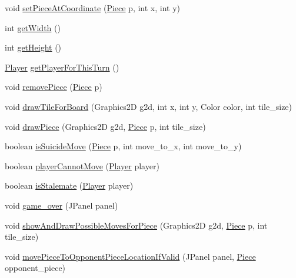 \begin{DoxyCompactItemize}
void \hyperlink{classchess_1_1_chess_board_ae9d535deacab87c0de3ee10c8b8868f4}{set\+Piece\+At\+Coordinate} (\hyperlink{classpiece_1_1_piece}{Piece} p, int x, int y)
\item 
int \hyperlink{classchess_1_1_chess_board_a29781b412843a9db6c65adbaed0a5c07}{get\+Width} ()
\item 
int \hyperlink{classchess_1_1_chess_board_aae882150e2ecfda4defceabadff016c3}{get\+Height} ()
\item 
\hyperlink{enumchess_1_1_player}{Player} \hyperlink{classchess_1_1_chess_board_ae6fe2b06940fa56971e174e01fa22df1}{get\+Player\+For\+This\+Turn} ()
\item 
void \hyperlink{classchess_1_1_chess_board_af2f8678df1f61c42e6abb2591716451a}{remove\+Piece} (\hyperlink{classpiece_1_1_piece}{Piece} p)
\item 
void \hyperlink{classchess_1_1_chess_board_a1511b7e9055bbc9daff70f294bff92bc}{draw\+Tile\+For\+Board} (Graphics2\+D g2d, int x, int y, Color color, int tile\+\_\+size)
\item 
void \hyperlink{classchess_1_1_chess_board_a879f102e91c76d41ef78ccabf1174046}{draw\+Piece} (Graphics2\+D g2d, \hyperlink{classpiece_1_1_piece}{Piece} p, int tile\+\_\+size)
\item 
boolean \hyperlink{classchess_1_1_chess_board_a9afd8643586328685ca7bcbcf1cec4a4}{is\+Suicide\+Move} (\hyperlink{classpiece_1_1_piece}{Piece} p, int move\+\_\+to\+\_\+x, int move\+\_\+to\+\_\+y)
\item 
boolean \hyperlink{classchess_1_1_chess_board_a1eef0b88f595b1501b2d12ab5e373e6f}{player\+Cannot\+Move} (\hyperlink{enumchess_1_1_player}{Player} player)
\item 
boolean \hyperlink{classchess_1_1_chess_board_ae8b13d31ee134f4365bc051b6178b2b5}{is\+Stalemate} (\hyperlink{enumchess_1_1_player}{Player} player)
\item 
void \hyperlink{classchess_1_1_chess_board_a81c34b69d1ab11b82272beb72bdb3555}{game\+\_\+over} (J\+Panel panel)
\item 
void \hyperlink{classchess_1_1_chess_board_aa85109bb8788435e3dfedcde5a32af6f}{show\+And\+Draw\+Possible\+Moves\+For\+Piece} (Graphics2\+D g2d, \hyperlink{classpiece_1_1_piece}{Piece} p, int tile\+\_\+size)
\item 
void \hyperlink{classchess_1_1_chess_board_a583d2c3e9a1397a9cc1c0cef3552c8e2}{move\+Piece\+To\+Opponent\+Piece\+Location\+If\+Valid} (J\+Panel panel, \hyperlink{classpiece_1_1_piece}{Piece} opponent\+\_\+piece)
\item 

\end{DoxyCompactItemize}
